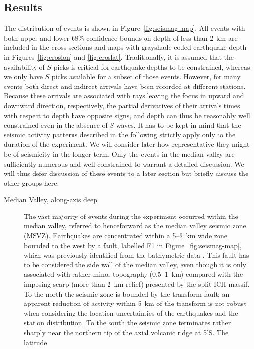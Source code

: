 \documentclass[jgr]{aguplus}
\begin{document}
\begin{article}
\subsection{Results}

The distribution of events is shown in
Figure~\ref{fig:seismag-map}. All events with both upper
and lower 68\% confidence bounds on depth of less than 2~km are
included in the cross-sections and maps with grayshade-coded earthquake
depth in Figures~\ref{fig:croslon} and \ref{fig:croslat}.
Traditionally, it is assumed that the availability of $S$ picks is
critical for earthquake depths to be constrained, whereas we only have
$S$ picks available for a subset of those events.  However, for many
events both direct and indirect arrivals have been recorded at
different stations.  Because these arrivals are associated with rays leaving
the focus in upward and downward direction, respectively, the
partial derivatives of their arrivals times with respect to depth have
opposite signs, and depth can thus be reasonably well constrained even
in the absence of $S$ waves.
It has to be kept in mind that the seismic activity patterns described
in the following strictly apply only to the duration of the
experiment. We will consider later how representative they might be of
seismicity in the longer term.  Only the events in the median valley
are sufficiently numerous and well-constrained to warrant a detailed
discussion.  We will thus defer discussion of these events to a later
section but briefly discuss the other groups here.
\begin{description}
\item[Median Valley, along-axis deep]  The vast majority of events during the
experiment occurred within the median valley, referred to henceforward
as the median valley seismic zone (MSVZ).  Earthquakes are
concentrated within a 5--8~km wide zone bounded to the west by a
fault, labelled F1 in Figure~\ref{fig:seismag-map}, which was
previously identified from the bathymetric data \citep{reston02}.
This fault has to be considered the side wall of the median
valley, even though it is only associated with rather minor topography
(0.5--1~km) compared with the imposing scarp (more than 2~km relief)
presented by the split ICH massif.  To the north the seismic zone is
bounded by the transform fault; an apparent reduction of activity
within 5~km of the transform is not robust when considering the
location uncertainties of the earthquakes and the station
distribution. To the south the seismic zone terminates rather sharply near the
northern tip of the axial volcanic ridge at 5'S.  The latitude

\end{description}
\end{article}
\end{document}
